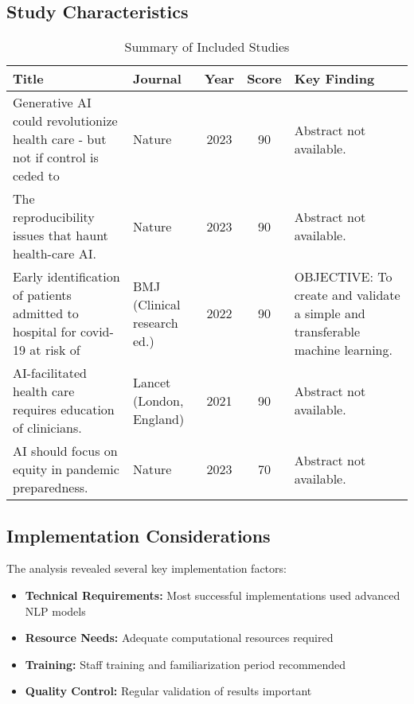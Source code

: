 \documentclass{article}%
\begin{document}
%
\subsection{Study Characteristics}%
\label{subsec:StudyCharacteristics}%


\begin{table}[htbp]%
\caption{Summary of Included Studies}%
\begin{tabularx}{\textwidth}{|>{\raggedright\arraybackslash}p{4.5cm}|>{\raggedright\arraybackslash}p{2cm}|c|c|>{\raggedright\arraybackslash}X|}%
\hline%
\textbf{Title} & \textbf{Journal} & \textbf{Year} & \textbf{Score} & \textbf{Key Finding} \\%
\hline%
Generative AI could revolutionize health care - but not if control is ceded to & Nature & 2023 & 90 & Abstract not available. \\%
\hline%
The reproducibility issues that haunt health-care AI. & Nature & 2023 & 90 & Abstract not available. \\%
\hline%
Early identification of patients admitted to hospital for covid-19 at risk of & BMJ (Clinical research ed.) & 2022 & 90 & OBJECTIVE: To create and validate a simple and transferable machine learning. \\%
\hline%
AI-facilitated health care requires education of clinicians. & Lancet (London, England) & 2021 & 90 & Abstract not available. \\%
\hline%
AI should focus on equity in pandemic preparedness. & Nature & 2023 & 70 & Abstract not available. \\%
\hline%
\end{tabularx}%
\end{table}

%
\subsection{Implementation Considerations}%
\label{subsec:ImplementationConsiderations}%
The analysis revealed several key implementation factors:%
\begin{itemize}%
\item \textbf{Technical Requirements:} Most successful implementations used advanced NLP models%
\item \textbf{Resource Needs:} Adequate computational resources required%
\item \textbf{Training:} Staff training and familiarization period recommended%
\item \textbf{Quality Control:} Regular validation of results important%
\end{itemize}
\end{document}
